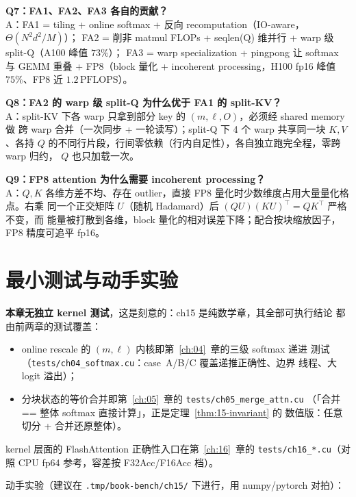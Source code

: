 \textbf{Q7：FA1、FA2、FA3 各自的贡献？}\\
A：FA1 = tiling + online softmax + 反向 recomputation（IO-aware，$\Theta(N^{2}d^{2}/M)$）；
FA2 = 削非 matmul FLOPs + seqlen(Q) 维并行 + warp 级 split-Q（A100 峰值 $73\%$）；
FA3 = warp specialization + pingpong 让 softmax 与 GEMM 重叠 + FP8（block 量化 +
incoherent processing，H100 fp16 峰值 $75\%$、FP8 近 $1.2\,\mathrm{PFLOPS}$）。

\textbf{Q8：FA2 的 warp 级 split-Q 为什么优于 FA1 的 split-KV？}\\
A：split-KV 下各 warp 只拿到部分 key 的 $(m, \ell, O)$，必须经 shared memory 做
跨 warp 合并（一次同步 + 一轮读写）；split-Q 下 4 个 warp 共享同一块 $K, V$、各持
$Q$ 的不同行片段，行间零依赖（行内自足性），各自独立跑完全程，零跨 warp 归约，
$Q$ 也只加载一次。

\textbf{Q9：FP8 attention 为什么需要 incoherent processing？}\\
A：$Q, K$ 各维方差不均、存在 outlier，直接 FP8 量化时少数维度占用大量量化格点。右乘
同一个正交矩阵 $U$（随机 Hadamard）后 $(QU)(KU)^{\top} = QK^{\top}$ 严格不变，而
能量被打散到各维，block 量化的相对误差下降；配合按块缩放因子，FP8 精度可追平
fp16。

\section{最小测试与动手实验}

\textbf{本章无独立 kernel 测试}，这是刻意的：ch15 是纯数学章，其全部可执行结论
都由前两章的测试覆盖：
\begin{itemize}
  \item online rescale 的 $(m, \ell)$ 内核即第~\ref{ch:04}~章的三级 softmax 递进
        测试（\texttt{tests/\allowbreak{}ch04\_\allowbreak{}softmax.\allowbreak{}cu}：case~A/B/C 覆盖递推正确性、边界
        线程、大 logit 溢出）；
  \item 分块状态的等价合并即第~\ref{ch:05}~章的 \texttt{tests/\allowbreak{}ch05\_\allowbreak{}merge\_\allowbreak{}attn.\allowbreak{}cu}
        （「合并 == 整体 softmax 直接计算」，正是定理~\ref{thm:15-invariant} 的
        数值版：任意切分 + 合并还原整体）。
\end{itemize}
kernel 层面的 FlashAttention 正确性入口在第~\ref{ch:16}~章的
\texttt{tests/\allowbreak{}ch16\_\allowbreak{}*.\allowbreak{}cu}（对照 CPU fp64 参考，容差按 F32Acc/F16Acc 档）。

动手实验（建议在 \texttt{.\allowbreak{}tmp/\allowbreak{}book-bench/\allowbreak{}ch15/\allowbreak{}} 下进行，用 numpy/pytorch 对拍）：

